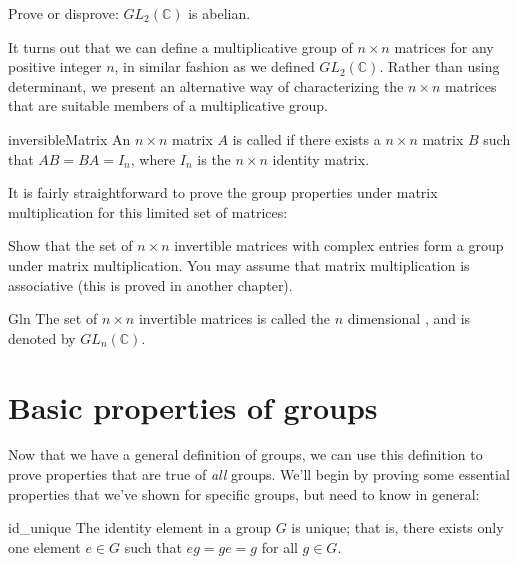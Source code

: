 \begin{exercise}{}
Prove or disprove: $GL_2(\mathbb C)$ is abelian.
\end{exercise}

It turns out that we can define a multiplicative group of $n \times n$ matrices for any positive integer $n$, in similar fashion as we defined $GL_2(\mathbb{C})$.  Rather than using determinant, we present an alternative way of characterizing the $n \times n$ matrices that are suitable members of a multiplicative group.

\begin{defn}{inversibleMatrix} 
An $n \times n$ matrix $A$ is called  if there exists a $n \times n$ matrix $B$ such that $AB = BA = I_n$, where $I_n$ is the $n \times n$ identity matrix.
\end{defn}

It is fairly straightforward to prove the group properties under matrix multiplication for this limited set of matrices:

\begin{exercise}{} 
Show that the set of  $n \times n$  invertible matrices with complex entries form a group under matrix multiplication.  You may assume that
matrix multiplication is associative (this is proved  in another chapter). 
\end{exercise}

\begin{defn}{Gln}
The set of $n \times n$ invertible matrices is called the $n$ dimensional , and is denoted by $GL_n(\mathbb{C})$.
\end{defn}


\section{Basic properties of groups}
\label{sec:Groups:GroupProperties}
 
Now that we have a general definition of groups, we can use this definition to prove properties that are true of \emph{all} groups. We'll begin by proving some essential properties that we've shown for specific groups, but need to know in general:

\begin{prop}{id_unique}
The identity element in a group $G$ is unique; that is, there exists
only one element $e \in G$ such that $eg = ge = g$ for all $g \in G$. 
\end{prop}
 
